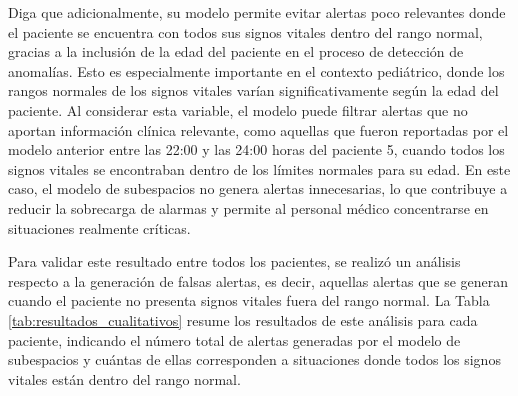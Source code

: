 Diga que adicionalmente, su modelo permite evitar alertas poco relevantes donde el paciente se encuentra con todos sus signos vitales dentro del rango normal, gracias a la inclusión de la edad del paciente en el proceso de detección de anomalías. Esto es especialmente importante en el contexto pediátrico, donde los rangos normales de los signos vitales varían significativamente según la edad del paciente. Al considerar esta variable, el modelo puede filtrar alertas que no aportan información clínica relevante, como aquellas que fueron reportadas por el modelo anterior entre las 22:00 y las 24:00 horas del paciente 5, cuando todos los signos vitales se encontraban dentro de los límites normales para su edad. En este caso, el modelo de subespacios no genera alertas innecesarias, lo que contribuye a reducir la sobrecarga de alarmas y permite al personal médico concentrarse en situaciones realmente críticas.

Para validar este resultado entre todos los pacientes, se realizó un análisis respecto a la generación de falsas alertas, es decir, aquellas alertas que se generan cuando el paciente no presenta signos vitales fuera del rango normal. La Tabla \ref{tab:resultados_cualitativos} resume los resultados de este análisis para cada paciente, indicando el número total de alertas generadas por el modelo de subespacios y cuántas de ellas corresponden a situaciones donde todos los signos vitales están dentro del rango normal.

